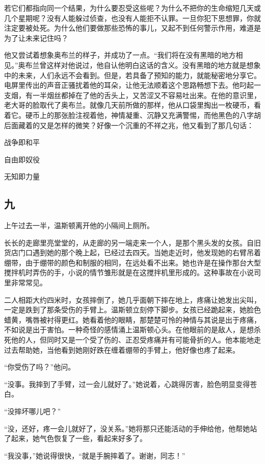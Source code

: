 若它们都指向同一个结果，为什么要忍受这些呢？为什么不把你的生命缩短几天或几个星期呢？没有人能躲过侦查，也没有人能拒不认罪。一旦你犯下思想罪，你就注定要被处死。为什么他们要做那些恐怖的事儿，又起不到任何警示作用，难道是为了让未来记住吗？

他又尝试着想象奥布兰的样子，并成功了一点。``我们将在没有黑暗的地方相见。''奥布兰曾这样对他说过，他自认他明白这话的含义。没有黑暗的地方就是想象中的未来，人们永远不会看到。但是，若具备了预知的能力，就能秘密地分享它。电屏里传出的声音正骚扰着他的耳朵，让他无法顺着这个思路畅想下去。他叼起一支烟，有一半烟丝都掉在了他的舌头上，又苦涩又不容易吐出来。在他的意识里，老大哥的脸取代了奥布兰。就像几天前所做的那样，他从口袋里掏出一枚硬币，看着它。硬币上的那张脸注视着他，神情凝重、沉静又充满警惕，而他黑色的八字胡后面藏着的又是怎样的微笑？好像一个沉重的不祥之兆，他又看到了那几句话：

战争即和平

自由即奴役

无知即力量

\subsection{九}\label{ux4e5d}

上午过去一半，温斯顿离开他的小隔间上厕所。

长长的走廊里亮堂堂的，从走廊的另一端走来一个人，是那个黑头发的女孩。自旧货店门口遇到她的那个晚上起，已经过去四天。当她走近时，他发现她的右臂吊着绷带，由于绷带的颜色和制服的相同，在远处看不出来。她也许是在操作那台大型搅拌机时弄伤的手，小说的情节雏形就是在这搅拌机里形成的。这种事故在小说司里非常常见。

二人相距大约四米时，女孩摔倒了，她几乎面朝下摔在地上，疼痛让她发出尖叫，一定是跌到了那条受伤的手臂上。温斯顿立刻停下脚步。女孩已经跪起来，她脸色蜡黄，嘴唇被衬得更红。她看着他的眼睛，那楚楚可怜的神情与其说是出于疼痛，不如说是出于害怕。一种奇怪的感情涌上温斯顿心头。在他眼前的是敌人，是想杀死他的人，但同时又是一个受了伤的、正忍受疼痛并有可能骨折的人。他本能地走过去帮助她，当他看到她刚好跌在缠着绷带的手臂上，他好像也疼了起来。

``你受伤了吗？''他问。

``没事。我摔到了手臂，过一会儿就好了。''她说着，心跳得厉害，脸色明显变得苍白。

``没摔坏哪儿吧？''

``没，还好，疼一会儿就好了，没关系。''她将那只还能活动的手伸给他，他帮她站了起来，她气色恢复了一些，看起来好多了。

``我没事，''她说得很快，``就是手腕摔着了。谢谢，同志！''

